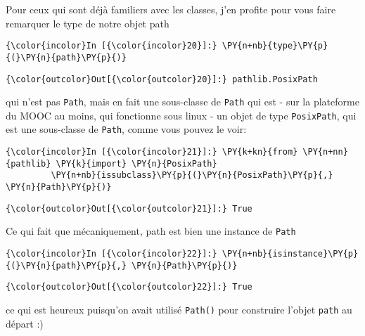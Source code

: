     Pour ceux qui sont déjà familiers avec les classes, j'en profite pour
vous faire remarquer le type de notre objet path

    \begin{Verbatim}[commandchars=\\\{\},frame=single,framerule=0.3mm,rulecolor=\color{cellframecolor}]
{\color{incolor}In [{\color{incolor}20}]:} \PY{n+nb}{type}\PY{p}{(}\PY{n}{path}\PY{p}{)}
\end{Verbatim}


\begin{Verbatim}[commandchars=\\\{\},frame=single,framerule=0.3mm,rulecolor=\color{cellframecolor}]
{\color{outcolor}Out[{\color{outcolor}20}]:} pathlib.PosixPath
\end{Verbatim}
            
    qui n'est pas \texttt{Path}, mais en fait une sous-classe de
\texttt{Path} qui est - sur la plateforme du MOOC au moins, qui
fonctionne sous linux - un objet de type \texttt{PosixPath}, qui est une
sous-classe de \texttt{Path}, comme vous pouvez le voir:

    \begin{Verbatim}[commandchars=\\\{\},frame=single,framerule=0.3mm,rulecolor=\color{cellframecolor}]
{\color{incolor}In [{\color{incolor}21}]:} \PY{k+kn}{from} \PY{n+nn}{pathlib} \PY{k}{import} \PY{n}{PosixPath}
         \PY{n+nb}{issubclass}\PY{p}{(}\PY{n}{PosixPath}\PY{p}{,} \PY{n}{Path}\PY{p}{)}
\end{Verbatim}


\begin{Verbatim}[commandchars=\\\{\},frame=single,framerule=0.3mm,rulecolor=\color{cellframecolor}]
{\color{outcolor}Out[{\color{outcolor}21}]:} True
\end{Verbatim}
            
    Ce qui fait que mécaniquement, path est bien une instance de
\texttt{Path}

    \begin{Verbatim}[commandchars=\\\{\},frame=single,framerule=0.3mm,rulecolor=\color{cellframecolor}]
{\color{incolor}In [{\color{incolor}22}]:} \PY{n+nb}{isinstance}\PY{p}{(}\PY{n}{path}\PY{p}{,} \PY{n}{Path}\PY{p}{)}
\end{Verbatim}


\begin{Verbatim}[commandchars=\\\{\},frame=single,framerule=0.3mm,rulecolor=\color{cellframecolor}]
{\color{outcolor}Out[{\color{outcolor}22}]:} True
\end{Verbatim}
            
    ce qui est heureux puisqu'on avait utilisé \texttt{Path()} pour
construire l'objet \texttt{path} au départ :)


    
    
    

